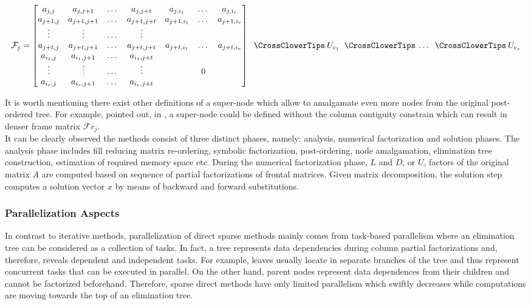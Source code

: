  \begin{equation} \label{eq:mm-10}
	\mathcal{F}_{j} = \begin{bmatrix}a_{j,j} & a_{j,j+1} & \dots & a_{j,j+t}  & a_{j,i_1} & \dots & a_{j,i_r} \\
a_{j+1,j} & a_{j+1,j+1} & \dots & a_{j+1,j+t}  & a_{j+1,i_1} & \dots & a_{j+1,i_r} \\
\vdots & \vdots & \dots & \vdots \\
a_{j+t,j}  & a_{j+t,j+1} & \dots & a_{j+t,j+t}  & a_{j+t,i_1} & \dots & a_{j+t,i_r} \\
a_{i_1,j} & a_{i_1,j+1} & \dots & a_{i_1,j+t} \\
\vdots & \vdots & \dots & \vdots  & & 0\\ 
a_{i_r,j} & a_{i_r,j+1} & \dots & a_{i_r,j+t} \\
\end{bmatrix} \extendadd U_{c_1} \extendadd \dots \extendadd U_{c_s} 
\end{equation}


It is worth mentioning there exist other definitions of a super-node which allow to amalgamate even more nodes from the original post-ordered tree. For example, \citeauthor{mult-frontal-original:2} pointed out, in \cite{mult-frontal-original:2}, a super-node could be defined without the column contiguity constrain which can result in denser frame matrix $\mathcal{F}r_{j}$.\\


It can be clearly observed the methods consist of three distinct phases, namely: analysis, numerical factorization and solution phases. The analysis phase includes fill reducing matrix re-ordering, symbolic factorization, post-ordering, node amalgamation, elimination tree construction, estimation of required memory space etc. During the numerical factorization phase, $L$ and $D$, or $U$, factors of the original matrix $A$ are computed based on sequence of partial factorizations of frontal matrices. Given matrix decomposition, the solution step computes a solution vector $x$ by means of backward and forward substitutions.\\



\subsubsection{Parallelization Aspects}
\label{subseq:direct-parallel-aspects}


In contrast to iterative methods, parallelization of direct sparse methods mainly comes from task-based parallelism where an elimination tree can be considered as a collection of tasks. In fact, a tree represents data dependencies during column partial factorizations and, therefore, reveals dependent and independent tasks. For example, leaves usually locate in separate branches of the tree and thus represent concurrent tasks that can be executed in parallel. On the other hand, parent nodes represent data dependences from their children and cannot be factorized beforehand. Therefore, sparse direct methods have only limited parallelism which swiftly decreases while computations are moving towards the top of an elimination tree.\\


